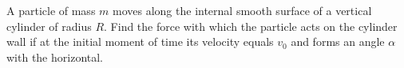 \item A particle of mass \( m \) moves along the internal smooth surface of a vertical cylinder of radius \( R \). Find the force with which the particle acts on the cylinder wall if at the initial moment of time its velocity equals \( v_0 \) and forms an angle \( \alpha \) with the horizontal.